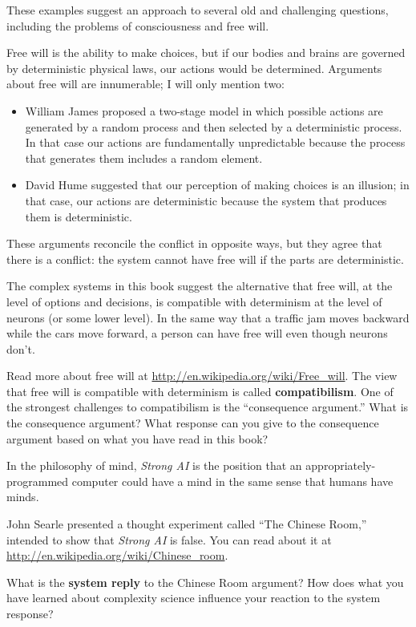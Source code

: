 \documentclass[10pt]{book}
\begin{document}
These examples suggest an approach to several old and challenging
questions, including the problems of consciousness and free will.

Free will is the ability to make choices, but if our bodies and brains
are governed by deterministic physical laws, our actions would be
determined.  Arguments about free will are innumerable; I will
only mention two:

\begin{itemize}

\item William James proposed a two-stage model in which
  possible actions are generated by a random process and then selected
  by a deterministic process.  In that case our actions are
  fundamentally unpredictable because the process that generates them
  includes a random element.

\item David Hume suggested that our perception of making choices
  is an illusion; in that case, our actions are deterministic because
  the system that produces them is deterministic.

\end{itemize}

These arguments reconcile the conflict in opposite ways, but they
agree that there is a conflict: the system cannot have free will if
the parts are deterministic.

The complex systems in this book suggest the alternative
that free will, at the level of options and decisions, is compatible
with determinism at the level of neurons (or some lower level).  In
the same way that a traffic jam moves backward while the cars move
forward, a person can have free will even though neurons don't.


\begin{exercise}

Read more about free will at
\url{http://en.wikipedia.org/wiki/Free_will}.  The view that free will
is compatible with determinism is called {\bf compatibilism}.  One of
the strongest challenges to compatibilism is the ``consequence
argument.''  What is the consequence argument?  What response can you
give to the consequence argument based on what you have read in this
book?
\end{exercise}


\begin{exercise}

In the philosophy of mind, {\em Strong AI} is the position that an
appropriately-programmed computer could have a mind in the same sense
that humans have minds.

John Searle presented a thought experiment called ``The Chinese Room,''
intended to show that {\em Strong AI} is false.  You can read about
it at \url{http://en.wikipedia.org/wiki/Chinese_room}.

What is the {\bf system reply} to the Chinese Room argument?
How does what you have learned about complexity science influence
your reaction to the system response?

\end{exercise}
\end{document}
